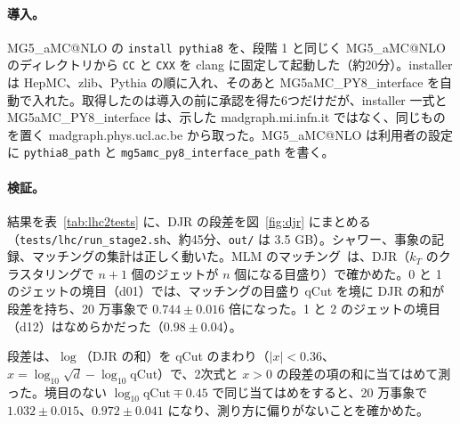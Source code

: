 \documentclass[a4paper,10pt]{ltjsarticle}
\makeatletter
\newcommand{\MGaMC}{MG5\_aMC@NLO}
\makeatother
\begin{document}
\paragraph{導入。}\MGaMC{} の \texttt{install pythia8} を、段階 1 と同じく \MGaMC{} のディレクトリから \texttt{CC} と \texttt{CXX} を clang に固定して起動した（約20分）。installer は HepMC、zlib、Pythia の順に入れ、そのあと MG5aMC\_PY8\_interface を自動で入れた。取得したのは導入の前に承認を得た6つだけだが、installer 一式と MG5aMC\_PY8\_interface は、示した madgraph.mi.infn.it ではなく、同じものを置く madgraph.phys.ucl.ac.be から取った。\MGaMC{} は利用者の設定に \texttt{pythia8\_path} と \texttt{mg5amc\_py8\_interface\_path} を書く。

\paragraph{検証。}結果を表~\ref{tab:lhc2tests} に、DJR の段差を図~\ref{fig:djr} にまとめる（\nolinkurl{tests/lhc/run_stage2.sh}、約45分、\texttt{out/} は 3.5 GB）。シャワー、事象の記録、マッチングの集計は正しく動いた。MLM のマッチング~\cite{mlm}は、DJR（$k_T$ のクラスタリングで $n+1$ 個のジェットが $n$ 個になる目盛り）で確かめた。0 と 1 のジェットの境目（d01）では、マッチングの目盛り qCut を境に DJR の和が段差を持ち、20 万事象で $0.744\pm0.016$ 倍になった。1 と 2 のジェットの境目（d12）はなめらかだった（$0.98\pm0.04$）。

段差は、$\log$（DJR の和）を qCut のまわり（$|x|<0.36$、$x=\log_{10}\sqrt d-\log_{10}\mathrm{qCut}$）で、2次式と $x>0$ の段差の項の和に当てはめて測った。境目のない $\log_{10}\mathrm{qCut}\mp0.45$ で同じ当てはめをすると、20 万事象で $1.032\pm0.015$、$0.972\pm0.041$ になり、測り方に偏りがないことを確かめた。
\end{document}
